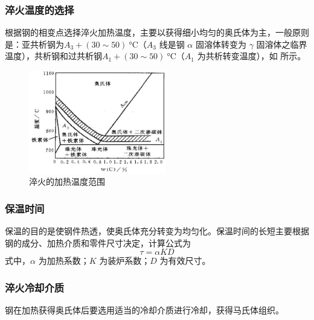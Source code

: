 \documentclass[a4paper,utf8]{article}
\begin{document}
        \subsubsection{淬火温度的选择}
            根据钢的相变点选择淬火加热温度，主要以获得细小均匀的奥氏体为主，一般原则是：亚共析钢为$A_{3}+(30{\sim}50)~\unit{\degreeCelsius}$（$A_3$ 线是钢 $\alpha$ 固溶体转变为 $\gamma$ 固溶体之临界温度），共析钢和过共析钢$A_{1}+(30{\sim}50)~\unit{\degreeCelsius}$（$A_1$ 为共析转变温度），如 所示。
            \begin{figure}[!ht]
                \caption{淬火的加热温度范围\label{fig:1}}
                \includegraphics[width=60mm]{fig1.jpg}
            \end{figure}
        \subsubsection{保温时间}
            保温的目的是使钢件热透，使奥氏体充分转变为均匀化。保温时间的长短主要根据钢的成分、加热介质和零件尺寸决定，计算公式为
            \begin{equation}
                \tau=\alpha KD
            \end{equation}
            式中，$\alpha$ 为加热系数；$K$ 为装炉系数；$D$ 为有效尺寸。
        \subsubsection{淬火冷却介质}
            钢在加热获得奥氏体后要选用适当的冷却介质进行冷却，获得马氏体组织。
\end{document}

